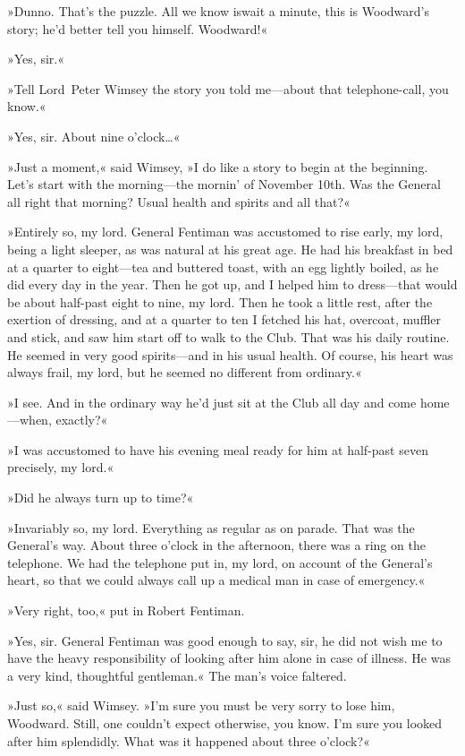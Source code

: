 »Dunno. That's the puzzle. All we know is\textellipsis  wait a minute, this is Woodward's story; he'd better tell you himself. Woodward!«

»Yes, sir.«

»Tell Lord~Peter Wimsey the story you told me—about that telephone-call, you know.«

»Yes, sir. About nine o'clock\dots«

»Just a moment,« said Wimsey, »I do like a story to begin at the beginning. Let's start with the morning—the mornin' of November 10th. Was the General all right that morning? Usual health and spirits and all that?«

»Entirely so, my lord. General Fentiman was accustomed to rise early, my lord, being a light sleeper, as was natural at his great age. He had his breakfast in bed at a quarter to eight—tea and buttered toast, with an egg lightly boiled, as he did every day in the year. Then he got up, and I helped him to dress—that would be about half-past eight to nine, my lord. Then he took a little rest, after the exertion of dressing, and at a quarter to ten I fetched his hat, overcoat, muffler and stick, and saw him start off to walk to the Club. That was his daily routine. He seemed in very good spirits—and in his usual health. Of course, his heart was always frail, my lord, but he seemed no different from ordinary.«

»I see. And in the ordinary way he'd just sit at the Club all day and come home—when, exactly?«

»I was accustomed to have his evening meal ready for him at half-past seven precisely, my lord.«

»Did he always turn up to time?«

»Invariably so, my lord. Everything as regular as on parade. That was the General's way. About three o'clock in the afternoon, there was a ring on the telephone. We had the telephone put in, my lord, on account of the General's heart, so that we could always call up a medical man in case of emergency.«

»Very right, too,« put in Robert Fentiman.

»Yes, sir. General Fentiman was good enough to say, sir, he did not wish me to have the heavy responsibility of looking after him alone in case of illness. He was a very kind, thoughtful gentleman.« The man's voice faltered.

»Just so,« said Wimsey. »I'm sure you must be very sorry to lose him, Woodward. Still, one couldn't expect otherwise, you know. I'm sure you looked after him splendidly. What was it happened about three o'clock?«


